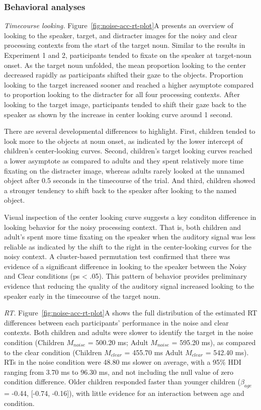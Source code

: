 \documentclass[english,floatsintext,man]{apa6}
\begin{document}
\hypertarget{behavioral-analyses-2}{%
\subsubsection{Behavioral analyses}\label{behavioral-analyses-2}}

\emph{Timecourse looking.} Figure~\ref{fig:noise-acc-rt-plot}A presents
an overview of looking to the speaker, target, and distracter images for
the noisy and clear processing contexts from the start of the target
noun. Similar to the results in Experiment 1 and 2, participants tended
to fixate on the speaker at target-noun onset. As the target noun
unfolded, the mean proportion looking to the center decreased rapidly as
participants shifted their gaze to the objects. Proportion looking to
the target increased sooner and reached a higher asymptote compared to
proportion looking to the distracter for all four processing contexts.
After looking to the target image, participants tended to shift their
gaze back to the speaker as shown by the increase in center looking
curve around 1 second.

There are several developmental differences to highlight. First,
children tended to look more to the objects at noun onset, as indicated
by the lower intercept of children's center-looking curves. Second,
children's target looking curves reached a lower asymptote as compared
to adults and they spent relatively more time fixating on the distracter
image, whereas adults rarely looked at the unnamed object after 0.5
seconds in the timecourse of the trial. And third, children showed a
stronger tendency to shift back to the speaker after looking to the
named object.

Visual inspection of the center looking curve suggests a key conditon
difference in looking behavior for the noisy processing context. That
is, both children and adult's spent more time fixating on the speaker
when the auditory signal was less reliable as indicated by the shift to
the right in the center-looking curves for the noisy context. A
cluster-based permutation test confirmed that there was evidence of a
significant difference in looking to the speaker between the Noisy and
Clear conditions (ps \textless{} .05). This pattern of behavior provides
preliminary evidence that reducing the quality of the auditory signal
increased looking to the speaker early in the timecourse of the target
noun.

\emph{RT.} Figure~\ref{fig:noise-acc-rt-plot}A shows the full
distribution of the estimated RT differences between each participants'
performance in the noise and clear contexts. Both children and adults
were slower to identify the target in the noise condition (Children
\(M_{noise}\) = 500.20 ms; Adult \(M_{noise}\) = 595.20 ms), as compared
to the clear condition (Children \(M_{clear}\) = 455.70 ms Adult
\(M_{clear}\) = 542.40 ms). RTs in the noise condition were 48.80 ms
slower on average, with a 95\% HDI ranging from 3.70 ms to 96.30 ms, and
not including the null value of zero condition difference. Older
children responded faster than younger children (\(\beta_{age}\) =
-0.44, {[}-0.74, -0.16{]}), with little evidence for an interaction
between age and condition.
\end{document}
